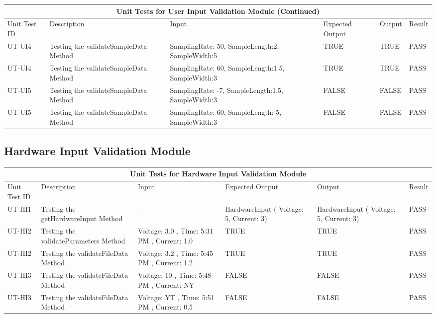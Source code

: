\documentclass[12pt, titlepage]{article}
\begin{document}
 \pagebreak 

 \begin{tabular}{ |p{1.5cm}||p{2cm}|p{2.5cm}|p{2cm}|p{2cm}|p{1.5cm}|}
  \hline
  \multicolumn{6}{|c|}{Unit Tests for User Input Validation Module (Continued)} \\
  \hline
  Unit Test ID & Description & Input & Expected Output & Output & Result\\
  \hline
  UT-UI4   & Testing the validateSampleData Method  &  SamplingRate: 50, SampleLength:2, SampleWidth:5 & TRUE & TRUE & PASS \\
  \hline
  UT-UI4   & Testing the validateSampleData Method  &  SamplingRate: 60, SampleLength:1.5, SampleWidth:3 & TRUE & TRUE & PASS \\
  \hline
  UT-UI5   & Testing the validateSampleData Method  &  SamplingRate: -7, SampleLength:1.5, SampleWidth:3 & FALSE & FALSE & PASS \\
  \hline
  UT-UI5  & Testing the validateSampleData Method  &  SamplingRate: 60, SampleLength:-5, SampleWidth:3 & FALSE & FALSE & PASS \\
  \hline
 \end{tabular}

 \subsection{Hardware Input Validation Module}
 \begin{tabular}{ |p{1.5cm}||p{2cm}|p{2cm}|p{3cm}|p{3cm}|p{1.5cm}|}
  \hline
  \multicolumn{6}{|c|}{Unit Tests for Hardware Input Validation Module} \\
  \hline
  Unit Test ID & Description & Input & Expected Output & Output & Result\\
  \hline
  UT-HI1   & Testing the getHardwareInput Method  &  -  & HardwareInput ( Voltage: 5, Current: 3) & HardwareInput ( Voltage: 5, Current: 3) & PASS \\
  \hline
  UT-HI2   & Testing the validateParameters Method  &  Voltage: 3.0 , Time: 5:31 PM , Current: 1.0 & TRUE & TRUE & PASS \\
  \hline
  UT-HI2   & Testing the validateFileData Method  &  Voltage: 3.2 , Time: 5:45 PM , Current: 1.2 & TRUE & TRUE & PASS \\
  \hline
  UT-HI3   & Testing the validateFileData Method  &  Voltage: 10 , Time: 5:48 PM , Current: NY & FALSE & FALSE & PASS \\
  \hline
  UT-HI3   & Testing the validateFileData Method  &  Voltage: YT , Time: 5:51 PM , Current: 0.5  & FALSE & FALSE & PASS \\
  \hline
 \end{tabular}
\end{document}

